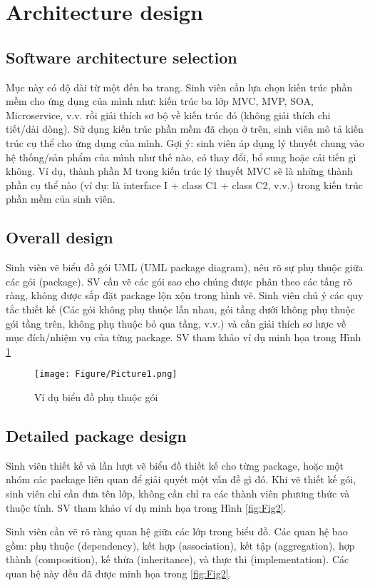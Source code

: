 \documentclass[../Main.tex]{subfiles}
\begin{document}
\section{Architecture design}
\subsection{Software architecture selection}
Mục này có độ dài từ một đến ba trang. Sinh viên cần lựa chọn kiến trúc phần mềm cho ứng dụng của mình như: kiến trúc ba lớp MVC, MVP, SOA, Microservice, v.v. rồi giải thích sơ bộ về kiến trúc đó (không giải thích chi tiết/dài dòng).
Sử dụng kiến trúc phần mềm đã chọn ở trên, sinh viên mô tả kiến trúc cụ thể cho ứng dụng của mình. Gợi ý: sinh viên áp dụng lý thuyết chung vào hệ thống/sản phẩm của mình như thế nào, có thay đổi, bổ sung hoặc cải tiến gì không. Ví dụ, thành phần M trong kiến trúc lý thuyết MVC sẽ là những thành phần cụ thể nào (ví dụ: là interface I + class C1 + class C2, v.v.) trong kiến trúc phần mềm của sinh viên.

\subsection{Overall design}
Sinh viên vẽ biểu đồ gói UML (UML package diagram), nêu rõ sự phụ thuộc giữa các gói (package). SV cần vẽ các gói sao cho chúng được phân theo các tầng rõ ràng, không được sắp đặt package lộn xộn trong hình vẽ. Sinh viên chú ý các quy tắc thiết kế (Các gói không phụ thuộc lẫn nhau, gói tầng dưới không phụ thuộc gói tầng trên, không phụ thuộc bỏ qua tầng, v.v.) và cần giải thích sơ lược về mục đích/nhiệm vụ của từng package. SV tham khảo ví dụ minh họa trong Hình \ref{fig:Fig1}
\begin{figure}[H]
    \centering
    \texttt{[image: Figure/Picture1.png]}
    \caption{Ví dụ biểu đồ phụ thuộc gói}
    \label{fig:Fig1}
\end{figure}
\subsection{Detailed package design}
Sinh viên thiết kế và lần lượt vẽ biểu đồ thiết kế cho từng package, hoặc một nhóm các package liên quan để giải quyết một vấn đề gì đó. Khi vẽ thiết kế gói, sinh viên chỉ cần đưa tên lớp, không cần chỉ ra các thành viên phương thức và thuộc tính. SV tham khảo ví dụ minh họa trong Hình \ref{fig:Fig2}.

Sinh viên cần vẽ rõ ràng quan hệ giữa các lớp trong biểu đồ. Các quan hệ bao gồm: phụ thuộc (dependency), kết hợp (association), kết tập (aggregation), hợp thành (composition), kế thừa (inheritance), và thực thi (implementation). Các quan hệ này đều đã được minh họa trong \ref{fig:Fig2}.
\end{document}
